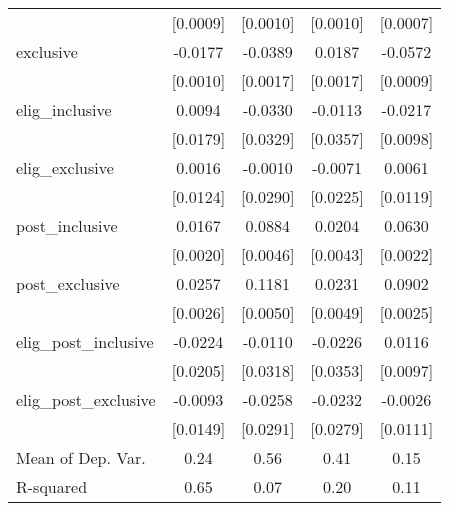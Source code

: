 \begin{table}[htbp]
\begin{tabular}{l*{4}{c}}
                    &    [0.0009]         &    [0.0010]         &    [0.0010]         &    [0.0007]         \\
\addlinespace
exclusive           &     -0.0177\sym{***}&     -0.0389\sym{***}&      0.0187\sym{***}&     -0.0572\sym{***}\\
                    &    [0.0010]         &    [0.0017]         &    [0.0017]         &    [0.0009]         \\
\addlinespace
elig\_inclusive      &      0.0094         &     -0.0330         &     -0.0113         &     -0.0217\sym{**} \\
                    &    [0.0179]         &    [0.0329]         &    [0.0357]         &    [0.0098]         \\
\addlinespace
elig\_exclusive      &      0.0016         &     -0.0010         &     -0.0071         &      0.0061         \\
                    &    [0.0124]         &    [0.0290]         &    [0.0225]         &    [0.0119]         \\
\addlinespace
post\_inclusive      &      0.0167\sym{***}&      0.0884\sym{***}&      0.0204\sym{***}&      0.0630\sym{***}\\
                    &    [0.0020]         &    [0.0046]         &    [0.0043]         &    [0.0022]         \\
\addlinespace
post\_exclusive      &      0.0257\sym{***}&      0.1181\sym{***}&      0.0231\sym{***}&      0.0902\sym{***}\\
                    &    [0.0026]         &    [0.0050]         &    [0.0049]         &    [0.0025]         \\
\addlinespace
elig\_post\_inclusive &     -0.0224         &     -0.0110         &     -0.0226         &      0.0116         \\
                    &    [0.0205]         &    [0.0318]         &    [0.0353]         &    [0.0097]         \\
\addlinespace
elig\_post\_exclusive &     -0.0093         &     -0.0258         &     -0.0232         &     -0.0026         \\
                    &    [0.0149]         &    [0.0291]         &    [0.0279]         &    [0.0111]         \\
\midrule
Mean of Dep. Var.   &        0.24         &        0.56         &        0.41         &        0.15         \\
R-squared           &        0.65         &        0.07         &        0.20         &        0.11         \\

\end{tabular}
\end{table}
